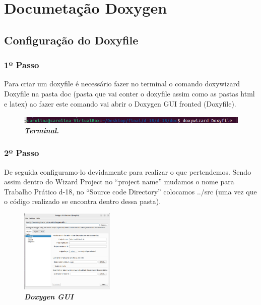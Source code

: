 \documentclass[a4wide]{report}
\begin{document}
{{{{\chapter{Documetação Doxygen}
\section{Configuração do Doxyfile}
\subsection{1º Passo}
\Large
Para criar um doxyfile é necessário fazer no terminal o comando doxywizard Doxyfile na pasta doc (pasta que vai conter o doxyfile assim como as pastas html e latex) ao fazer este comando vai abrir o Doxygen GUI fronted (Doxyfile).
\begin{figure}[hbt]
    \centering
    \includegraphics[width=1.00\textwidth]{imagem_1.png}
    \caption{\textbf{\textit{Terminal.}}\label{fig:imagem}}
\end{figure}

\subsection{2º Passo}
\Large
De seguida configuramo-lo devidamente para realizar o que pertendemos. Sendo assim dentro do Wizard Project no “project name” mudamos o nome para Trabalho Prático d-18, no “Source code Directory” colocamos ../src (uma vez que o código realizado se encontra dentro dessa pasta). 
\begin{figure}[hbt]
    \centering
    \includegraphics[width=0.40\textwidth]{imagem_2.png}
    \caption{\textbf{\textit{Doxygen GUI}}\label{fig:imagem}}
\end{figure}
\\
\\

}}}}
\end{document}
